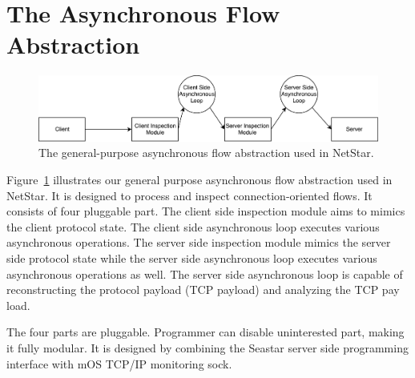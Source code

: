 \section{The Asynchronous Flow Abstraction}

\begin{figure}[!t]
  \centering
  \includegraphics[width=\columnwidth]{figure/async-flow.pdf}
  \vspace{-2mm}
  \caption{The general-purpose asynchronous flow abstraction used in NetStar.}
  \label{fig:async-flow}
  \vspace{-6mm}
\end{figure}

Figure~\ref{fig:async-flow} illustrates our general purpose asynchronous flow abstraction used in NetStar. It is designed to process and inspect connection-oriented flows. It consists of four pluggable part. The client side inspection module aims to mimics the client protocol state. The client side asynchronous loop executes various asynchronous operations. The server side inspection module mimics the server side protocol state while the server side asynchronous loop executes various asynchronous operations as well. The server side asynchronous loop is capable of reconstructing the protocol payload (TCP payload) and analyzing the TCP pay load.

The four parts are pluggable. Programmer can disable uninterested part, making it fully modular. It is designed by combining the Seastar server side programming interface with mOS TCP/IP monitoring sock. 
